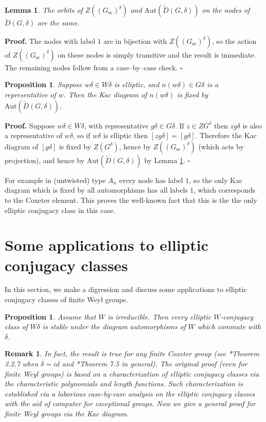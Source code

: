 \documentclass[10pt,leqno]{article}
\newtheorem{lemma}[equation]{Lemma}
\newtheorem{proposition}[equation]{Proposition}
\newtheorem{remark}[equation]{Remark}
{\theorembodyfont{\rmfamily}
\newtheorem{theoremplain}[equation]{Theorem}
\newtheorem{remarkplain}[equation]{Remark}
\newtheorem{editorialremarkplain}[equation]{Editorial Remark}
\newtheorem{exampleplain}[equation]{Example}
\newtheorem{corollaryplain}[equation]{Corollary}
}
\newcommand{\qed}{\hfill $\square$ \medskip}
\newenvironment{proof}[1][Proof]{\noindent\textbf{#1.} }{\qed}
\newcommand{\Aut}{\text{Aut}}
\newcommand{\Gsc}{G_{\text{sc}}}
\renewcommand{\sec}[1]{\section{#1}
\renewcommand{\theequation}{\thesection.\arabic{equation}}
  \setcounter{equation}{0}}
\newcommand\wt{\widetilde}
\newcommand{\Daffine}{\wt D(G,\delta)}
\def\d{\delta}
\renewcommand{\sec}[1]{\section{#1}
\renewcommand{\theequation}{\thesection.\arabic{equation}}
  \setcounter{equation}{0}}
\begin{document}
\begin{lemma}\label{6.7}
The orbits of  $Z((\Gsc)^\delta)$  and  $\Aut(\Daffine)$  on  the nodes of $\Daffine$
are the same.
\end{lemma}

\begin{proof}
The nodes with label $1$ are in bijection with $Z((\Gsc)^\delta)$,
so the action of $Z((\Gsc)^\delta)$ on these nodes is simply
transitive and the result is immediate.
The remaining nodes follow from a case--by--case check.
\end{proof}



\begin{proposition}
\label{p:fixed}
Suppose $w\delta\in W\delta$ is elliptic, and $n(w\delta)\in G\delta$ is a representative of $w$.
Then the Kac diagram of $n(w\delta)$ is fixed by $\Aut(\Daffine)$.
\end{proposition}

\begin{proof}
Suppose $w\delta\in W\delta$, with representative
$g\delta\in G\delta$.  If $z\in ZG^\delta$ then $zg\delta$ is also a
representative of $w\delta$, so if $w\delta$ is elliptic
then $[zg\delta]=[g\delta]$.  Therefore the Kac diagram of $[g\delta]$ is
fixed by $Z(G^\delta)$, hence by $Z((\Gsc)^\delta)$ (which acts by
projection), and hence by $\Aut(\Daffine)$ by 
Lemma \ref{6.7}.
\end{proof}


For example in (untwisted) type $A_n$ every node has label $1$, so the
only Kac diagram which is fixed by all automorphisms has all labels
$1$, which corresponds to the Coxeter element. This proves the well-known fact
that this is the the only elliptic conjugacy class in this case.


\sec{Some applications to elliptic conjugacy classes}
In this section, we make a digression and discuss some applications to elliptic conjugacy classes of finite Weyl groups. 

\begin{proposition}\label{stable-d'}
Assume that $W$ is irreducible. Then every elliptic $W$-conjugacy class of $W\delta$ is stable under the diagram automorphisms of $W$
which commute with $\delta$.
\end{proposition}

\begin{remark}
  In fact, the result is true for any finite Coxeter group (see \cite{geck_pfeiffer}*{Theorem 3.2.7} when $\d=id$ and
  \cite{he_minimal_length_double_cosets}*{Theorem 7.5} in general). The original proof (even for finite Weyl groups) is based on a characterization of elliptic conjugacy classes via the characteristic polynomials and length functions. Such characterization is established via a laborious case-by-case analysis on the elliptic conjugacy classes with the aid of computer for exceptional groups. Now we give a general proof for finite Weyl groups via the Kac diagram. 
\end{remark}
\end{document}
